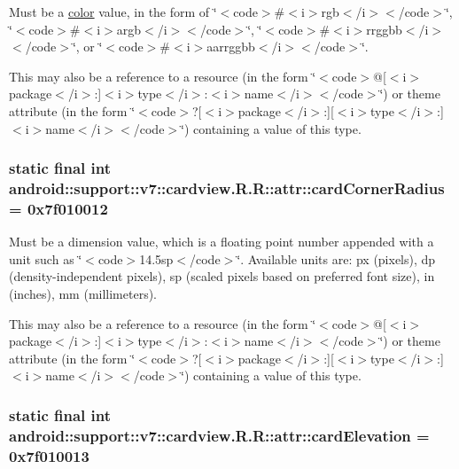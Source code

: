 Must be a \hyperlink{classandroid_1_1support_1_1v7_1_1cardview_1_1_r_1_1color}{color} value, in the form of \char`\"{}$<$code$>$\#$<$i$>$rgb$<$/i$>$$<$/code$>$\char`\"{}, \char`\"{}$<$code$>$\#$<$i$>$argb$<$/i$>$$<$/code$>$\char`\"{}, \char`\"{}$<$code$>$\#$<$i$>$rrggbb$<$/i$>$$<$/code$>$\char`\"{}, or \char`\"{}$<$code$>$\#$<$i$>$aarrggbb$<$/i$>$$<$/code$>$\char`\"{}. 

This may also be a reference to a resource (in the form \char`\"{}$<$code$>$@\mbox{[}$<$i$>$package$<$/i$>$:\mbox{]}$<$i$>$type$<$/i$>$:$<$i$>$name$<$/i$>$$<$/code$>$\char`\"{}) or theme attribute (in the form \char`\"{}$<$code$>$?\mbox{[}$<$i$>$package$<$/i$>$:\mbox{]}\mbox{[}$<$i$>$type$<$/i$>$:\mbox{]}$<$i$>$name$<$/i$>$$<$/code$>$\char`\"{}) containing a value of this type. \hypertarget{classandroid_1_1support_1_1v7_1_1cardview_1_1_r_1_1attr_8240bc3be35c43e6aa86fdfbaa14ee36}{
\subsubsection[{cardCornerRadius}]{\setlength{\rightskip}{0pt plus 5cm}static final int android::support::v7::cardview.R.R::attr::cardCornerRadius = 0x7f010012}}
\label{classandroid_1_1support_1_1v7_1_1cardview_1_1_r_1_1attr_8240bc3be35c43e6aa86fdfbaa14ee36}


Must be a dimension value, which is a floating point number appended with a unit such as \char`\"{}$<$code$>$14.5sp$<$/code$>$\char`\"{}. Available units are: px (pixels), dp (density-independent pixels), sp (scaled pixels based on preferred font size), in (inches), mm (millimeters). 

This may also be a reference to a resource (in the form \char`\"{}$<$code$>$@\mbox{[}$<$i$>$package$<$/i$>$:\mbox{]}$<$i$>$type$<$/i$>$:$<$i$>$name$<$/i$>$$<$/code$>$\char`\"{}) or theme attribute (in the form \char`\"{}$<$code$>$?\mbox{[}$<$i$>$package$<$/i$>$:\mbox{]}\mbox{[}$<$i$>$type$<$/i$>$:\mbox{]}$<$i$>$name$<$/i$>$$<$/code$>$\char`\"{}) containing a value of this type. \hypertarget{classandroid_1_1support_1_1v7_1_1cardview_1_1_r_1_1attr_b8eab882c4b7664100df7cb0c332addb}{
\subsubsection[{cardElevation}]{\setlength{\rightskip}{0pt plus 5cm}static final int android::support::v7::cardview.R.R::attr::cardElevation = 0x7f010013}}
\label{classandroid_1_1support_1_1v7_1_1cardview_1_1_r_1_1attr_b8eab882c4b7664100df7cb0c332addb}


